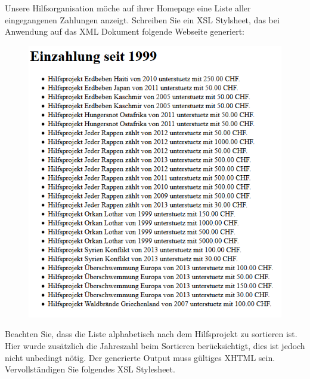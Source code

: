Unsere Hilfsorganisation möche auf ihrer Homepage eine Liste aller eingegangenen Zahlungen anzeigt.  Schreiben Sie ein XSL Stylsheet, das bei Anwendung auf das XML Dokument folgende Webseite generiert:

\begin{figure}[H]
\centering
\includegraphics[scale=0.4]{BootCamp/XSLT/xslt_bootcamp_ziel.png}
\end{figure}


Beachten Sie, dass die Liste alphabetisch nach dem Hilfsprojekt zu sortieren ist. Hier wurde zusätzlich die Jahreszahl beim Sortieren berücksichtigt, dies ist jedoch nicht unbedingt nötig. Der generierte Output muss gültiges XHTML sein. Vervollständigen Sie folgendes XSL Stylesheet.

